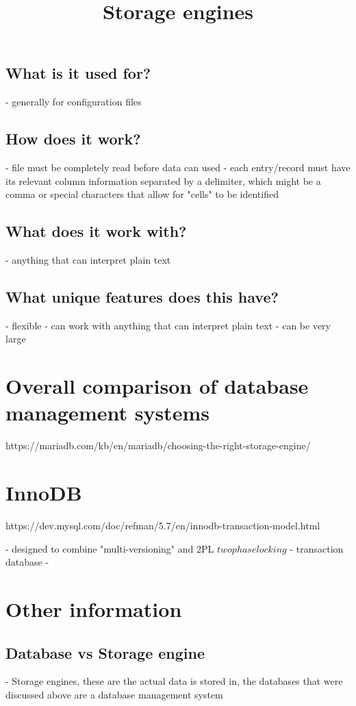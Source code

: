 \section{What is it used for?}
- generally for configuration files

\section{How does it work?}
- file must be completely read before data can used
- each entry/record must have its relevant column information separated by a delimiter, which might be a comma or special characters that allow for "cells" to be identified

\section{What does it work with?}
- anything that can interpret plain text

\section{What unique features does this have?}
- flexible - can work with anything that can interpret plain text
- can be very large

\chapter{Overall comparison of database management systems}

\title{Storage engines}
https://mariadb.com/kb/en/mariadb/choosing-the-right-storage-engine/

\chapter{InnoDB}
https://dev.mysql.com/doc/refman/5.7/en/innodb-transaction-model.html

- designed to combine "multi-versioning" and 2PL \(two phase locking\)
- transaction database
-

\chapter{}

\chapter{Other information}

\section{Database vs Storage engine}
- Storage engines, these are the actual data is stored in, the databases that were discussed above are a database management system
